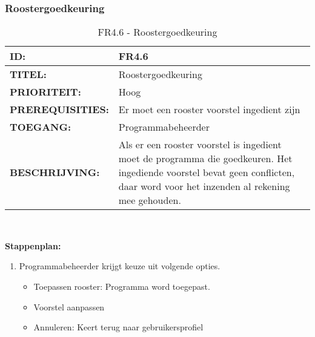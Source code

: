 \subsubsection{Roostergoedkeuring}
\noindent\begin{table}[H]
            \begin{tabular}{l | p{10cm}}
                \textbf{ID:} & FR4.6 \\ \hline
                \textbf{TITEL:} & Roostergoedkeuring\\ \hline
                \textbf{PRIORITEIT:} & Hoog \\ \hline
                \textbf{PREREQUISITIES:} & Er moet een rooster voorstel ingedient zijn\\ \hline
                \textbf{TOEGANG:} & Programmabeheerder \\ \hline
                \textbf{BESCHRIJVING:} & Als er een rooster voorstel is ingedient moet de programma die goedkeuren. Het ingediende voorstel bevat geen conflicten, daar word voor het inzenden al rekening mee gehouden.
            \end{tabular}\\
            \caption{FR4.6 - Roostergoedkeuring}
            \label{tab:FR4.6 - Roostergoedkeuring}
        \end{table}

\textbf{Stappenplan:}
	\begin{enumerate}
	\item Programmabeheerder krijgt keuze uit volgende opties.
		\begin{itemize}
		\item Toepassen rooster: Programma word toegepast. 
		\item Voorstel aanpassen 
		\item Annuleren: Keert terug naar gebruikersprofiel 
		\end{itemize}
	\end{enumerate}		
		
